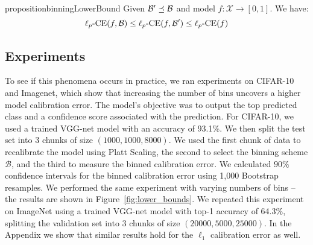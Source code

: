 
\begin{restatable}{proposition}{binningLowerBound}
Given $\mathcal{B}{}' \preceq \mathcal{B}{}$ and model $f : \mathcal{X} \to [0, 1]$. We have:
\[  \ell_p\mbox{-CE}(f, \mathcal{B}{}) \leq \ell_p\mbox{-CE}(f, \mathcal{B}{}') \leq \ell_p\mbox{-CE}(f) \]
\end{restatable}

\subsection{Experiments}

To see if this phenomena occurs in practice, we ran experiments on CIFAR-10 and Imagenet, which show that increasing the number of bins uncovers a higher model calibration error.
The model's objective was to output the top predicted class and a confidence score associated with the prediction.
For CIFAR-10, we used a trained VGG-net model with an accuracy of 93.1\%.
We then split the test set into 3 chunks of size $(1000, 1000, 8000)$.
We used the first chunk of data to recalibrate the model using Platt Scaling, the second to select the binning scheme $\mathcal{B}$, and the third to measure the binned calibration error.
We calculated $90\%$ confidence intervals for the binned calibration error using 1,000 Bootstrap resamples.
We performed the same experiment with varying numbers of bins --
the results are shown in Figure~\ref{fig:lower_bounds}. We repeated this experiment on ImageNet using a trained VGG-net model with top-1 accuracy of 64.3\%, splitting the validation set into 3 chunks of size $(20000, 5000, 25000)$.
In the Appendix we show that similar results hold for the $\ell_1$ calibration error as well.

